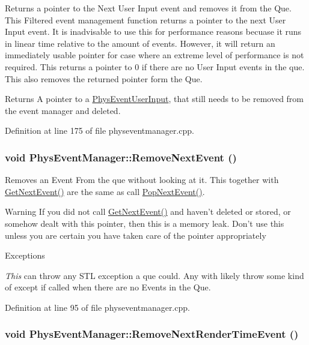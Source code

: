 Returns a pointer to the Next User Input event and removes it from the Que. This Filtered event management function returns a pointer to the next User Input event. It is inadvisable to use this for performance reasons becuase it runs in linear time relative to the amount of events. However, it will return an immediately usable pointer for case where an extreme level of performance is not required. This returns a pointer to 0 if there are no User Input events in the que. This also removes the returned pointer form the Que. \begin{DoxyReturn}{Returns}
A pointer to a \hyperlink{classPhysEventUserInput}{PhysEventUserInput}, that still needs to be removed from the event manager and deleted. 
\end{DoxyReturn}


Definition at line 175 of file physeventmanager.cpp.\hypertarget{classPhysEventManager_ad040054bd9018ff0fd27ad78ec1e87fa}{
\subsubsection[{RemoveNextEvent}]{\setlength{\rightskip}{0pt plus 5cm}void PhysEventManager::RemoveNextEvent ()}}
\label{d5/dd7/classPhysEventManager_ad040054bd9018ff0fd27ad78ec1e87fa}


Removes an Event From the que without looking at it. This together with \hyperlink{classPhysEventManager_a6de94bc6c23dcbd7e15785cadee2e80b}{GetNextEvent()} are the same as call \hyperlink{classPhysEventManager_a3122b32172326ac32cfecc828b820977}{PopNextEvent()}. \begin{DoxyWarning}{Warning}
If you did not call \hyperlink{classPhysEventManager_a6de94bc6c23dcbd7e15785cadee2e80b}{GetNextEvent()} and haven't deleted or stored, or somehow dealt with this pointer, then this is a memory leak. Don't use this unless you are certain you have taken care of the pointer appropriately 
\end{DoxyWarning}

\begin{DoxyExceptions}{Exceptions}
\item[{\em This}]can throw any STL exception a que could. Any with likely throw some kind of except if called when there are no Events in the Que. \end{DoxyExceptions}


Definition at line 95 of file physeventmanager.cpp.\hypertarget{classPhysEventManager_a56acc075e743921e27284c023b3298ce}{
\subsubsection[{RemoveNextRenderTimeEvent}]{\setlength{\rightskip}{0pt plus 5cm}void PhysEventManager::RemoveNextRenderTimeEvent ()}}
\label{d5/dd7/classPhysEventManager_a56acc075e743921e27284c023b3298ce}


